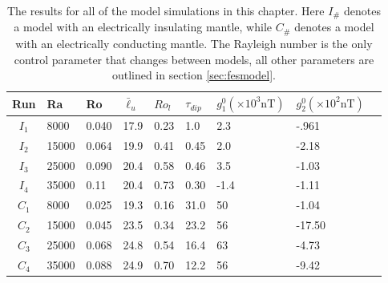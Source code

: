 \begin{table}
\centering
\begin{tabular}{cllllllll}
\multicolumn{1}{l}{Run} & Ra    & Ro    & $\bar{\ell}_{u}$ & $Ro_{l}$ & $\tau_{dip}$ & $g_1^0 (\times 10^{3} \textrm{nT})$ & $g_2^0 (\times 10^{2} \textrm{nT})$ \\ \hline  %
$I_{1}$                 & 8000  & 0.040 & 17.9             & 0.23     & 1.0          & 2.3                                 & -.961      &  \\                               %
$I_{2}$                 & 15000 & 0.064 & 19.9             & 0.41     & 0.45         & 2.0                                 & -2.18      &  \\                                %
$I_{3}$                 & 25000 & 0.090 & 20.4             & 0.58     & 0.46         & 3.5                                 & -1.03      &  \\                                %
$I_{4}$                 & 35000 & 0.11  & 20.4             & 0.73     & 0.30         & -1.4                                & -1.11      &  \\                               %
$C_{1}$                 & 8000  & 0.025 & 19.3             & 0.16     & 31.0         & 50                                  & -1.04      &  \\                               %
$C_{2}$                 & 15000 & 0.045 & 23.5             & 0.34     & 23.2         & 56                                  & -17.50      &  \\                                 %
$C_{3}$                 & 25000 & 0.068 & 24.8             & 0.54     & 16.4         & 63                                  & -4.73      &  \\                                 %
$C_{4}$                 & 35000 & 0.088 & 24.9             & 0.70     & 12.2         & 56                                  & -9.42      &                                   %
\end{tabular}
\caption{The results for all of the model simulations in this chapter. Here $I_{\#}$ denotes a model with an electrically insulating mantle, while $C_{\#}$ denotes a model with an electrically conducting mantle. The Rayleigh number is the only control parameter that changes between models, all other parameters are outlined in section \ref{sec:fesmodel}.}
\label{tab:fesresults}
\end{table}

